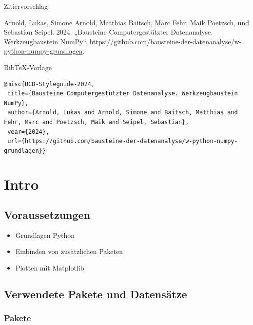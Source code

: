 \documentclass[
  letterpaper,
  DIV=11,
  numbers=noendperiod]{scrreprt}
\providecommand{\tightlist}{%
  \setlength{\itemsep}{0pt}\setlength{\parskip}{0pt}}\usepackage{longtable,booktabs,array}
\begin{document}
Zitiervorschlag

Arnold, Lukas, Simone Arnold, Matthias Baitsch, Marc Fehr, Maik
Poetzsch, und Sebastian Seipel. 2024. „Bausteine Computergestützter
Datenanalyse. Werkzeugbaustein NumPy``.
\url{https://github.com/bausteine-der-datenanalyse/w-python-numpy-grundlagen}.

BibTeX-Vorlage

\begin{verbatim}
@misc{BCD-Styleguide-2024,
 title={Bausteine Computergestützter Datenanalyse. Werkzeugbaustein NumPy},
 author={Arnold, Lukas and Arnold, Simone and Baitsch, Matthias and Fehr, Marc and Poetzsch, Maik and Seipel, Sebastian},
 year={2024},
 url={https://github.com/bausteine-der-datenanalyse/w-python-numpy-grundlagen}} 
\end{verbatim}

\chapter*{Intro}\label{intro-1}


\section*{Voraussetzungen}\label{voraussetzungen-2}


\begin{itemize}
\tightlist
\item
  Grundlagen Python
\item
  Einbinden von zusätzlichen Paketen
\item
  Plotten mit Matplotlib
\end{itemize}

\section*{Verwendete Pakete und
Datensätze}\label{verwendete-pakete-und-datensuxe4tze-1}


\subsection*{Pakete}\label{pakete}
\end{document}
